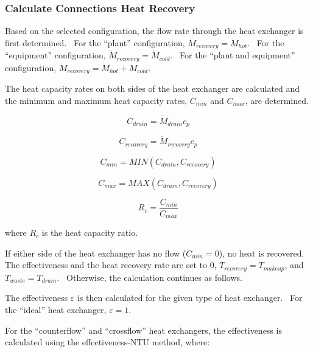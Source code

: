 \subsubsection{Calculate Connections Heat Recovery}\label{calculate-connections-heat-recovery}

Based on the selected configuration, the flow rate through the heat exchanger is first determined.~ For the ``plant'' configuration, \({\dot M_{recovery}} = {\dot M_{hot}}\).~ For the ``equipment'' configuration, \({\dot M_{recovery}} = {\dot M_{cold}}\).~ For the ``plant and equipment'' configuration, \({\dot M_{recovery}} = {\dot M_{hot}} + {\dot M_{cold}}\).

The heat capacity rates on both sides of the heat exchanger are calculated and the minimum and maximum heat capacity rates, \({C_{min}}\) and \({C_{max}}\), are determined.

\begin{equation}
{C_{drain}} = {\dot M_{drain}}{c_p}
\end{equation}

\begin{equation}
{C_{recovery}} = {\dot M_{recovery}}{c_p}
\end{equation}

\begin{equation}
{C_{min}} = MIN({C_{drain}},{C_{recovery}})
\end{equation}

\begin{equation}
{C_{max}} = MAX({C_{drain}},{C_{recovery}})
\end{equation}

\begin{equation}
{R_c} = \frac{{{C_{min}}}}{{{C_{max}}}}
\end{equation}

where \({R_c}\) is the heat capacity ratio.

If either side of the heat exchanger has no flow (\({C_{min}} = 0\)), no heat is recovered.~ The effectiveness and the heat recovery rate are set to 0, \({T_{recovery}} = {T_{makeup}}\), and \({T_{waste}} = {T_{drain}}\).~ Otherwise, the calculation continues as follows.

The effectiveness \(\varepsilon\) is then calculated for the given type of heat exchanger.~ For the ``ideal'' heat exchanger, \(\varepsilon = 1\).

For the ``counterflow'' and ``crossflow'' heat exchangers, the effectiveness is calculated using the effectiveness-NTU method, where:

